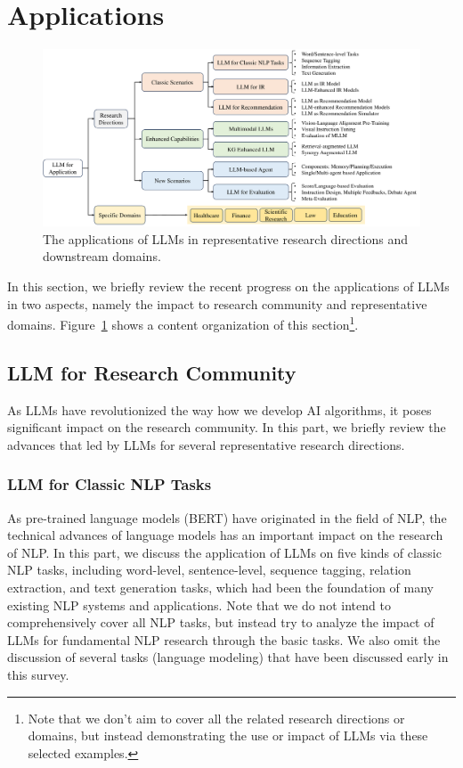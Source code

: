 \section{Applications}\label{sec-application}

\begin{figure}[h]
    \centering
        \includegraphics[width=1\textwidth]{images/application.pdf}
    \caption{The applications of LLMs in representative research directions and downstream domains. }
    \label{fig:application}
\end{figure}

{In this section, we briefly review the recent progress on the applications of LLMs in two aspects, namely the impact to research community and representative domains.}
Figure~\ref{fig:application} shows a content organization of this section\footnote{Note that we don't aim to cover all the related research directions or domains, but instead demonstrating the use or impact of LLMs via these selected examples. }. 

\subsection{LLM for Research Community} \label{sec:llm4community}
As LLMs have revolutionized the way how we develop AI algorithms, it poses significant impact on the research community. In this part, we briefly review the advances that led by LLMs for  several representative research directions.  


\subsubsection{LLM for Classic NLP Tasks}
As pre-trained language models (\eg BERT) have originated in the field of NLP, the technical advances of language models has an important impact on the research of NLP. In this part, we discuss the application of LLMs on five kinds of classic NLP tasks, including word-level, sentence-level, sequence tagging, relation extraction, and text generation tasks, which had been the foundation of many existing NLP systems and applications.   
Note that we do not intend to comprehensively cover all NLP tasks, but instead try to analyze the impact of LLMs for fundamental NLP research through the basic tasks.
We also omit the discussion of several tasks (\eg language modeling) that have been discussed early in this survey. 



